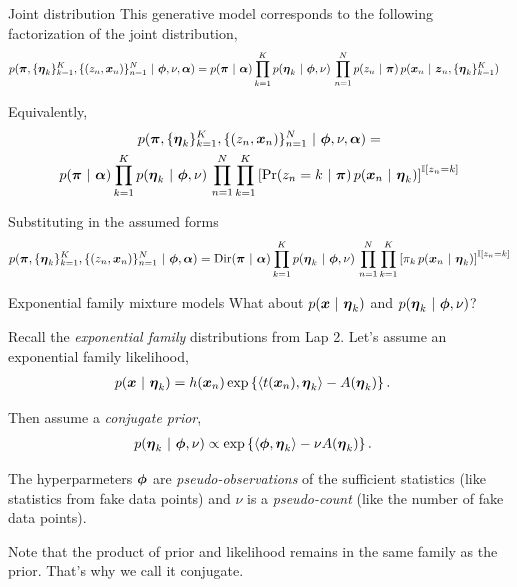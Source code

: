 \documentclass[aspectratio=169]{beamer}
\begin{document}
\begin{frame}{Joint distribution}
    This generative model corresponds to the following factorization of the joint distribution,
    \begin{align}
        p(\boldsymbol{\pi}, \{\boldsymbol{\eta}_k\}_{k=1}^K, \{(z_n, \boldsymbol{x}_n)\}_{n=1}^N ~\vert~ \boldsymbol{\phi}, \nu, \boldsymbol{\alpha}) 
        &= p(\boldsymbol{\pi} ~\vert~ \boldsymbol{\alpha}) \prod_{k=1}^K p(\boldsymbol{\eta}_k ~\vert~ \boldsymbol{\phi}, \nu) \, \prod_{n=1}^N p(z_n ~\vert~ \boldsymbol{\pi}) \, p(\boldsymbol{x}_n ~\vert~ \boldsymbol{z}_n, \{\boldsymbol{\eta}_k\}_{k=1}^K)
    \end{align}
    
    Equivalently, 
    \begin{multline}
        p(\boldsymbol{\pi}, \{\boldsymbol{\eta}_k\}_{k=1}^K, \{(z_n, \boldsymbol{x}_n)\}_{n=1}^N ~\vert~ \boldsymbol{\phi}, \nu, \boldsymbol{\alpha}) 
        = \\
        p(\boldsymbol{\pi} ~\vert~ \boldsymbol{\alpha}) \prod_{k=1}^K p(\boldsymbol{\eta}_k ~\vert~ \boldsymbol{\phi}, \nu) \, \prod_{n=1}^N \prod_{k=1}^K \left[ \Pr(z_n = k ~\vert~ \boldsymbol{\pi}) \, p(\boldsymbol{x}_n ~\vert~ \boldsymbol{\eta}_k) \right]^{\mathbb{I}[z_n = k]}
    \end{multline}
    
    Substituting in the assumed forms 
    \begin{align}
        p(\boldsymbol{\pi}, \{\boldsymbol{\eta}_k\}_{k=1}^K, \{(z_n, \boldsymbol{x}_n)\}_{n=1}^N ~\vert~ \boldsymbol{\phi}, \boldsymbol{\alpha}) 
        =
        \mathrm{Dir}(\boldsymbol{\pi} ~\vert~ \boldsymbol{\alpha}) \prod_{k=1}^K p(\boldsymbol{\eta}_k ~\vert~ \boldsymbol{\phi}, \nu) \, \prod_{n=1}^N \prod_{k=1}^K \left[ \pi_k \, p(\boldsymbol{x}_n ~\vert~ \boldsymbol{\eta}_k) \right]^{\mathbb{I}[z_n = k]}
    \end{align}
\end{frame}

\begin{frame}{Exponential family mixture models}
    What about $p(\boldsymbol{x} ~\vert~ \boldsymbol{\eta}_k)$ and $p(\boldsymbol{\eta}_k ~\vert~ \boldsymbol{\phi}, \nu)$?
    
    Recall the \textit{exponential family} distributions from Lap 2. Let's assume an exponential family likelihood,
    \begin{align}
        p(\boldsymbol{x} ~\vert~ \boldsymbol{\eta}_k) &= h(\boldsymbol{x}_n) \exp \left \{\langle t(\boldsymbol{x}_n), \boldsymbol{\eta}_k \rangle - A(\boldsymbol{\eta}_k) \right \}.
    \end{align}
    
    Then assume a \textit{conjugate prior},
    \begin{align}
        p(\boldsymbol{\eta}_k ~\vert~ \boldsymbol{\phi}, \nu) &\propto \exp \left \{ \langle \boldsymbol{\phi}, \boldsymbol{\eta}_k \rangle - \nu A(\boldsymbol{\eta}_k) \right \}.
    \end{align}
    
    The hyperparmeters $\boldsymbol{\phi}$ are \textit{pseudo-observations} of the sufficient statistics (like statistics from fake data points) and $\nu$ is a \textit{pseudo-count} (like the number of fake data points).
    
    Note that the product of prior and likelihood remains in the same family as the prior. That's why we call it conjugate.
\end{frame}
\end{document}
